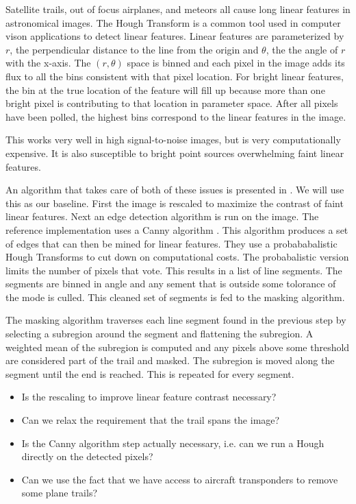 Satellite trails, out of focus airplanes, and meteors all cause long linear features in astronomical images.  The Hough Transform \citep{citation_needed} is a common tool used in computer vison applications to detect linear features.  Linear features are parameterized by $r$, the perpendicular distance to the line from the origin and $\theta$, the the angle of $r$ with the x-axis.  The $(r, \theta)$ space is binned and each pixel in the image adds its flux to all the bins consistent with that pixel location.  For bright linear features, the bin at the true location of the feature will fill up because more than one bright pixel is contributing to that location in parameter space.  After all pixels have been polled, the highest bins correspond to the linear features in the image.

This works very well in high signal-to-noise images, but is very computationally expensive.  It is also susceptible to bright point sources overwhelming faint linear features.  

An algorithm that takes care of both of these issues is presented in \cite{borncamp_lim16}.  We will use this
as our baseline.  First the image is rescaled to maximize the contrast of faint linear features.  Next an edge detection algorithm is run on the image.  The reference implementation uses a Canny algorithm \citep{canny86}.  This algorithm produces a set of edges that can then be mined for linear features.  They use a probababalistic Hough Transforms \citep{galambos99} to cut down on computational costs.  The probabalistic version limits the number of pixels that vote.  This results in a list of line segments.  The segments are binned in angle and any sement that is outside some tolorance of the mode is culled.  This cleaned set of segments is fed to the masking algorithm.

The masking algorithm traverses each line segment found in the previous step by selecting a subregion around the segment and flattening the subregion.  A weighted mean of the subregion is computed and any pixels above some threshold are considered part of the trail and masked.  The subregion is moved along the segment until the end is reached.  This is repeated for every segment.

\begin{note}
\begin{itemize}
\item Is the rescaling to improve linear feature contrast necessary?
\item Can we relax the requirement that the trail spans the image?
\item Is the Canny algorithm step actually necessary, i.e. can we run a Hough directly on the detected pixels?
\item Can we use the fact that we have access to aircraft transponders to remove some plane trails?
\end{itemize}
\end{note}


